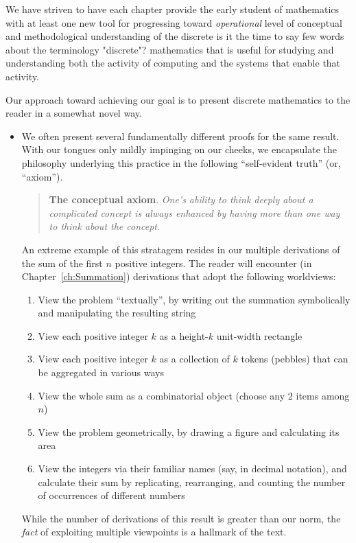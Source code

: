We have striven to have each chapter provide the early student of
mathematics with at least one new tool for progressing toward {\em
  operational} level of conceptual and methodological understanding of
the discrete 
{\Denis is it the time to say few words about the terminology "discrete"?}
mathematics that is useful for studying and understanding
both the activity of computing and the systems that enable that
activity.

Our approach toward achieving our goal is to present discrete
mathematics to the reader in a somewhat novel way.
\begin{itemize}
\item
We often present several fundamentally different proofs for the same
result.  With our tongues only mildly impinging on our cheeks, we
encapsulate the philosophy underlying this practice in the following
``self-evident truth'' (or, ``axiom'').  
\begin{quote}
{\bf The conceptual axiom}.
{\em
One's ability to think deeply about a complicated concept is always
enhanced by having more than one way to think about the concept.}
\end{quote}

An extreme example of this stratagem resides in our multiple
derivations of the sum of the first $n$ positive integers.  The reader
will encounter (in Chapter~\ref{ch:Summation}) derivations that adopt
the following worldviews:
  \begin{enumerate}
    \item
View the problem ``textually'', by writing out the summation
symbolically and manipulating the resulting string
  \item
View each positive integer $k$ as a height-$k$ unit-width rectangle
  \item
View each positive integer $k$ as a collection of $k$ tokens (pebbles)
that can be aggregated in various ways
  \item
View the whole sum as a combinatorial object (choose any $2$ items among $n$)
  \item
View the problem geometrically, by drawing a figure and calculating
its area
  \item
View the integers via their familiar names (say, in decimal notation),
and calculate their sum by replicating, rearranging, and counting the
number of occurrences of different numbers
  \end{enumerate}
While the number of derivations of this result is greater than our
norm, the {\em fact} of exploiting multiple viewpoints is a hallmark
of the text.


\end{itemize}
